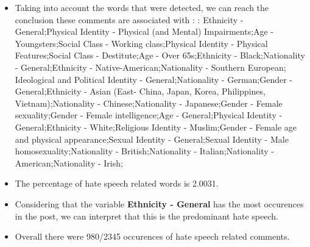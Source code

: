 \documentclass[11pt]{article}
\begin{document}
\begin{itemize}\item Taking into account the words that were detected, we can reach the conclusion these comments are associated with : : Ethnicity - General;Physical Identity - Physical (and Mental) Impairments;Age - Youngsters;Social Class - Working class;Physical Identity - Physical Features;Social Class - Destitute;Age - Over 65s;Ethnicity - Black;Nationality - General;Ethnicity - Native-American;Nationality - Southern European; Ideological and Political Identity - General;Nationality - German;Gender - General;Ethnicity - Asian (East- China, Japan, Korea, Philippines, Vietnam);Nationality - Chinese;Nationality - Japanese;Gender - Female sexuality;Gender - Female intelligence;Age - General;Physical Identity - General;Ethnicity - White;Religious Identity - Muslim;Gender - Female age and physical appearance;Sexual Identity - General;Sexual Identity - Male homosexuality;Nationality - British;Nationality - Italian;Nationality - American;Nationality - Irish;%

\item The percentage of hate speech related words is 2.0031.

\item Considering that the variable \textbf{Ethnicity - General} has the most occurences in the post, we can interpret that this is the predominant hate speech.

\item Overall there were 980/2345 occurences of hate speech related comments.\end{itemize}
\end{document}
